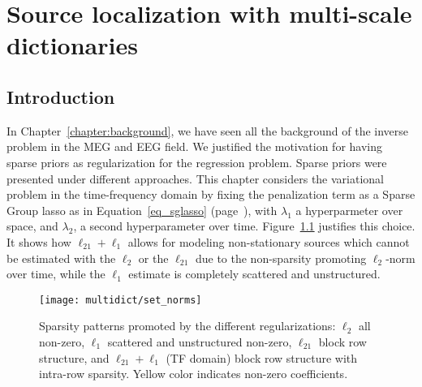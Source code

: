 
\chapter{Source localization with multi-scale dictionaries} %

\label{chapter:multiscale} %
\noindent\makebox[\linewidth]{\rule{0.75\paperwidth}{0.4pt}}
\noindent\makebox[\linewidth]{\rule{0.75\paperwidth}{0.4pt}}

\localtableofcontents %

\noindent\makebox[\linewidth]{\rule{0.75\paperwidth}{0.4pt}}
\noindent\makebox[\linewidth]{\rule{0.75\paperwidth}{0.4pt}}
\newpage

\section{Introduction}
In Chapter~\ref{chapter:background}, we have seen all the background of the inverse problem in the MEG and EEG field. We justified the motivation for having sparse priors as regularization for the regression problem. Sparse priors were presented under different approaches. This chapter considers the variational problem in the time-frequency domain by fixing the penalization term as a Sparse Group \ac{lasso} as in Equation~\eqref{eq_sglasso} (page~\pageref{eq_sglasso}), with $\lambda_1$ a hyperparmeter over space, and $\lambda_2$, a second hyperparameter over time. Figure~\ref{fig:set_norms} justifies this choice. It shows how $\ell_{21}+\ell_1$ allows for modeling non-stationary sources which cannot be estimated with the $\ell_2$ or the $\ell_{21}$ due to the non-sparsity promoting $\ell_2$-norm over time, while the $\ell_1$ estimate is completely scattered and unstructured.\\

\begin{figure}
\centering
	\texttt{[image: multidict/set\_norms]}
    \caption{Sparsity patterns promoted by the different regularizations: $\ell_2$ all non-zero, $\ell_1$ scattered and unstructured non-zero, $\ell_{21}$ block row structure, and $\ell_{21} + \ell_1$ (TF domain) block row structure with intra-row sparsity. Yellow color indicates non-zero coefficients.}
    \label{fig:set_norms}
\end{figure}


